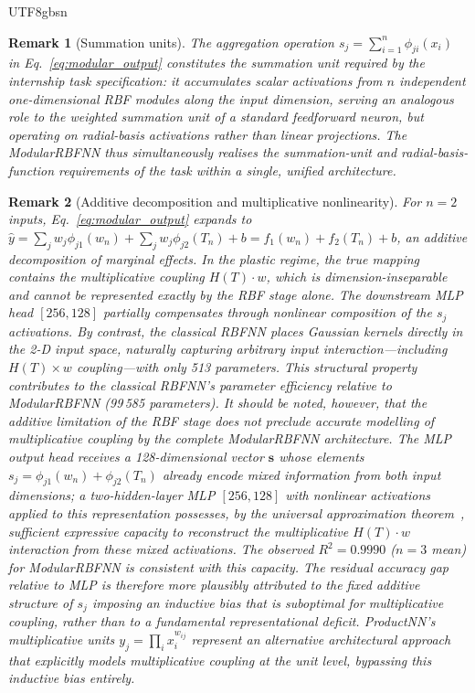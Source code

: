 \documentclass[a4paper,12pt]{report}
\newtheorem{remark}{Remark}
\begin{document}
\begin{CJK}{UTF8}{gbsn}
\begin{remark}[Summation units]
The aggregation operation $s_j = \sum_{i=1}^{n}\phi_{ji}(x_i)$ in
Eq.~\eqref{eq:modular_output} constitutes the \emph{summation unit} required by the
internship task specification: it accumulates scalar activations from $n$ independent
one-dimensional RBF modules along the input dimension, serving an analogous role to the
weighted summation unit of a standard feedforward neuron, but operating on radial-basis
activations rather than linear projections.  The ModularRBFNN thus simultaneously
realises the summation-unit and radial-basis-function requirements of the task within a
single, unified architecture.
\end{remark}

\begin{remark}[Additive decomposition and multiplicative nonlinearity]
For $n = 2$ inputs, Eq.~\eqref{eq:modular_output} expands to
$\hat{y} = \sum_j w_j\phi_{j1}(w_n) + \sum_j w_j\phi_{j2}(T_n) + b = f_1(w_n) + f_2(T_n) + b$,
an additive decomposition of marginal effects. In the plastic regime, the true mapping
contains the multiplicative coupling $H(T)\cdot w$, which is dimension-inseparable and
cannot be represented exactly by the RBF stage alone. The downstream MLP head
$[256,128]$ partially compensates through nonlinear composition of the $s_j$ activations.
By contrast, the classical RBFNN places Gaussian kernels directly in the 2-D input space,
naturally capturing arbitrary input interaction---including $H(T)\times w$ coupling---with
only 513 parameters. This structural property contributes to the classical RBFNN's
parameter efficiency relative to ModularRBFNN (99\,585 parameters).
It should be noted, however, that the additive limitation of the RBF stage does not
preclude accurate modelling of multiplicative coupling by the complete ModularRBFNN
architecture. The MLP output head receives a 128-dimensional vector $\mathbf{s}$ whose
elements $s_j = \phi_{j1}(w_n) + \phi_{j2}(T_n)$ already encode mixed information from
both input dimensions; a two-hidden-layer MLP $[256,128]$ with nonlinear activations
applied to this representation possesses, by the universal approximation
theorem~\cite{hornik1991}, sufficient expressive capacity to reconstruct the
multiplicative $H(T)\cdot w$ interaction from these mixed activations. The observed
$R^2 = 0.9990$ ($n=3$ mean) for ModularRBFNN is consistent with this capacity.
The residual accuracy gap relative to MLP is therefore more plausibly attributed to
the fixed additive structure of $s_j$ imposing an inductive bias that is suboptimal
for multiplicative coupling, rather than to a fundamental representational deficit.
ProductNN's multiplicative units $y_j = \prod_i x_i^{w_{ij}}$ represent an alternative
architectural approach that explicitly models multiplicative coupling at the unit level,
bypassing this inductive bias entirely.
\end{remark}


\end{CJK}
\end{document}
